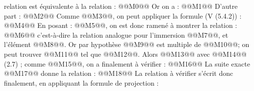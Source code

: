 
relation est équivalente à la relation :
@@M0@@
Or on a :
@@M1@@
D'autre part :
@@M2@@
Comme @@M3@@, on peut appliquer la formule (V (5.4.2)) :
@@M4@@
En posant : @@M5@@, on est donc ramené à montrer la relation :
@@M6@@
c'est-à-dire la relation analogue pour l'immersion @@M7@@, et l'élément @@M8@@. Or par hypothèse @@M9@@ est multiple de @@M10@@; on peut trouver @@M11@@ tel que @@M12@@. Alors @@M13@@ avec @@M14@@ (2.7) ; comme @@M15@@, on a finalement à vérifier :
@@M16@@
La suite exacte
@@M17@@
donne la relation :
@@M18@@
La relation à vérifier s'écrit donc finalement, en appliquant la formule de
projection :
